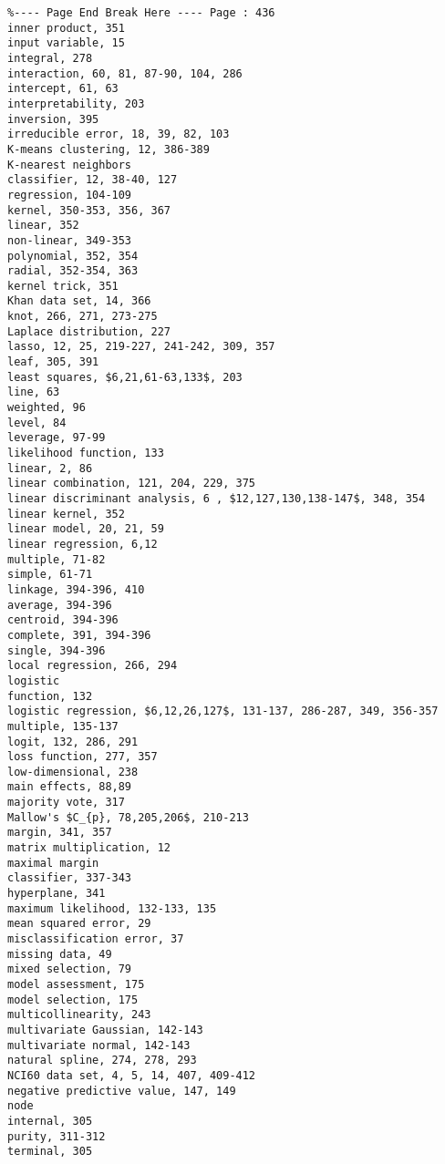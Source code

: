 \documentclass[10pt]{article}
\begin{document}
\begin{verbatim}
%---- Page End Break Here ---- Page : 436
inner product, 351
input variable, 15
integral, 278
interaction, 60, 81, 87-90, 104, 286
intercept, 61, 63
interpretability, 203
inversion, 395
irreducible error, 18, 39, 82, 103
K-means clustering, 12, 386-389
K-nearest neighbors
classifier, 12, 38-40, 127
regression, 104-109
kernel, 350-353, 356, 367
linear, 352
non-linear, 349-353
polynomial, 352, 354
radial, 352-354, 363
kernel trick, 351
Khan data set, 14, 366
knot, 266, 271, 273-275
Laplace distribution, 227
lasso, 12, 25, 219-227, 241-242, 309, 357
leaf, 305, 391
least squares, $6,21,61-63,133$, 203
line, 63
weighted, 96
level, 84
leverage, 97-99
likelihood function, 133
linear, 2, 86
linear combination, 121, 204, 229, 375
linear discriminant analysis, 6 , $12,127,130,138-147$, 348, 354
linear kernel, 352
linear model, 20, 21, 59
linear regression, 6,12
multiple, 71-82
simple, 61-71
linkage, 394-396, 410
average, 394-396
centroid, 394-396
complete, 391, 394-396
single, 394-396
local regression, 266, 294
logistic
function, 132
logistic regression, $6,12,26,127$, 131-137, 286-287, 349, 356-357
multiple, 135-137
logit, 132, 286, 291
loss function, 277, 357
low-dimensional, 238
main effects, 88,89
majority vote, 317
Mallow's $C_{p}, 78,205,206$, 210-213
margin, 341, 357
matrix multiplication, 12
maximal margin
classifier, 337-343
hyperplane, 341
maximum likelihood, 132-133, 135
mean squared error, 29
misclassification error, 37
missing data, 49
mixed selection, 79
model assessment, 175
model selection, 175
multicollinearity, 243
multivariate Gaussian, 142-143
multivariate normal, 142-143
natural spline, 274, 278, 293
NCI60 data set, 4, 5, 14, 407, 409-412
negative predictive value, 147, 149
node
internal, 305
purity, 311-312
terminal, 305


\end{verbatim}
\end{document}
